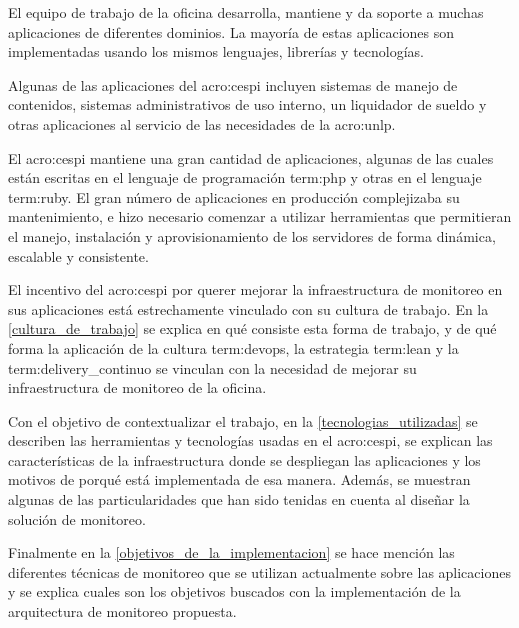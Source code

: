 El equipo de trabajo de la oficina desarrolla, mantiene y da soporte a muchas
aplicaciones de diferentes dominios. La mayoría de estas aplicaciones son
implementadas usando los mismos lenguajes, librerías y tecnologías.

Algunas de las aplicaciones del \gls{acro:cespi} incluyen sistemas de manejo de
contenidos, sistemas administrativos de uso interno, un liquidador de sueldo y
otras aplicaciones al servicio de las necesidades de la \gls{acro:unlp}.

El \gls{acro:cespi} mantiene una gran cantidad de aplicaciones, algunas de las
cuales están escritas en el lenguaje de programación \gls{term:php} y otras en
el lenguaje \gls{term:ruby}. El gran número de aplicaciones en producción
complejizaba su mantenimiento, e hizo necesario comenzar a utilizar
herramientas que permitieran el manejo, instalación y aprovisionamiento de los
servidores de forma dinámica, escalable y consistente.

El incentivo del \gls{acro:cespi} por querer mejorar la infraestructura de
monitoreo en sus aplicaciones está estrechamente vinculado con su cultura de
trabajo. En la \autoref{cultura_de_trabajo} se explica en qué consiste esta
forma de trabajo, y de qué forma la aplicación de la cultura \gls{term:devops},
la estrategia \gls{term:lean} y la \gls{term:delivery_continuo} se vinculan con
la necesidad de mejorar su infraestructura de monitoreo de la oficina.

Con el objetivo de contextualizar el trabajo, en la
\autoref{tecnologias_utilizadas} se describen las herramientas y tecnologías
usadas en el \gls{acro:cespi}, se explican las características de la
infraestructura donde se despliegan las aplicaciones y los motivos de porqué
está implementada de esa manera. Además, se muestran algunas de las
particularidades que han sido tenidas en cuenta al diseñar la solución de
monitoreo.

Finalmente en la \autoref{objetivos_de_la_implementacion} se hace mención
las diferentes técnicas de monitoreo que se utilizan actualmente sobre las
aplicaciones y se explica cuales son los objetivos buscados con la
implementación de la arquitectura de monitoreo propuesta.
